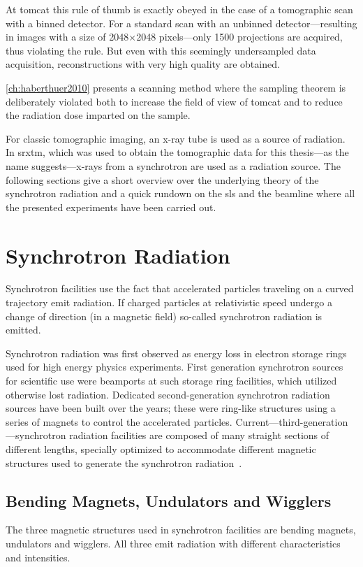 At \ac{tomcat} this rule of thumb is exactly obeyed in the case of a tomographic scan with a binned detector. For a standard scan with an unbinned detector---resulting in images with a size of 2048$\times$2048 pixels---only 1500 projections are acquired, thus violating the rule. But even with this seemingly undersampled data acquisition, reconstructions with very high quality are obtained.

\autoref{ch:haberthuer2010} presents a scanning method where the sampling theorem is deliberately violated both to increase the field of view of \ac{tomcat} and to reduce the radiation dose imparted on the sample.

For classic tomographic imaging, an x-ray tube is used as a source of radiation. In \ac{srxtm}, which was used to obtain the tomographic data for this thesis---as the name suggests---x-rays from a synchrotron are used as a radiation source. The following sections give a short overview over the underlying theory of the synchrotron radiation and a quick rundown on the \ac{sls} and the beamline where all the presented experiments have been carried out.

\section{Synchrotron Radiation}
Synchrotron facilities use the fact that accelerated particles traveling on a curved trajectory emit radiation. If charged particles at relativistic speed undergo a change of direction (\ie in a magnetic field) so-called synchrotron radiation is emitted. 

Synchrotron radiation was first observed as energy loss in electron storage rings used for high energy physics experiments. First generation synchrotron sources for scientific use were beamports at such storage ring facilities, which utilized otherwise lost radiation. Dedicated second-generation synchrotron radiation sources have been built over the years; these were ring-like structures using a series of magnets to control the accelerated particles. Current---third-generation---synchrotron radiation facilities are composed of many straight sections of different lengths, specially optimized to accommodate different magnetic structures used to generate the synchrotron radiation~\cite{Stampanoni2002a,Margaritondo2002,wwwsls}. 

\subsection{Bending Magnets, Undulators and Wigglers}
The three magnetic structures used in synchrotron facilities are bending magnets, undulators and wigglers. All three emit radiation with different characteristics and intensities.

